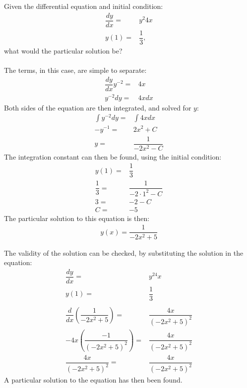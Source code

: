 \begin{tcolorbox}[colback=red!5!white,colframe=red!55!black,title=Example of solving a separable differential equation] 

Given the differential equation and initial condition:
\begin{align*}
	\dfrac{dy}{dx} =& y^2 4x \\
	y(1) =& \dfrac{1}{3},
\end{align*}
what would the particular solution be?
\\ \\
The terms, in this case, are simple to separate: 
\begin{align*}
	\dfrac{dy}{dx} y^{-2} =& 4x \\
	y^{-2} dy =& 4x dx 
\end{align*}
Both sides of the equation are then integrated, and solved for $y$:
\begin{align*}
	\int{y^{-2} dy} =& \int{4x dx} \\
	-y^{-1} =& 2x^2 +C \\
	y =& \dfrac{1}{-2x^2-C}
\end{align*}
The integration constant can then be found, using the initial condition:
\begin{align*}
	y(1) =& \dfrac{1}{3} \\
	\dfrac{1}{3} =& \dfrac{1}{-2 \cdot 1^2-C} \\
	3 =& -2-C \\
	C =& -5
\end{align*}
The particular solution to this equation is then:
\begin{align*}
	y(x) = \dfrac{1}{-2x^2+5}
\end{align*}

The validity of the solution can be checked, by substituting the solution in the equation:
\begin{align*}
	\dfrac{dy}{dx} =& y^24x \\
	y(1) =& \dfrac{1}{3}  \\
	\\
	\dfrac{d}{dx} \left(\dfrac{1}{-2x^2+5}\right) =& \dfrac{4x}{(-2x^2+5)^2} \\
	-4x\left(\dfrac{-1}{(-2x^2+5)^2}\right)  =& \dfrac{4x}{(-2x^2+5)^2} \\
	\dfrac{4x}{(-2x^2+5)^2} =& \dfrac{4x}{(-2x^2+5)^2}
\end{align*}
A particular solution to the equation has then been found.
\end{tcolorbox}